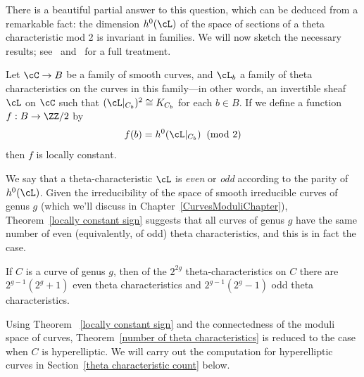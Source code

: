  There is a beautiful partial answer to this question, which can be deduced from a remarkable fact: the dimension $h^0(\cL)$ of the space of sections of a theta characteristic mod 2 is invariant in families.
We will now
sketch the necessary results; see~\cite{MumfordPaper} and~\cite{JHPaper} for a full treatment.

 \begin{theorem}\label{locally constant sign} Let $\cC \to B$ be a family of smooth curves, and $\cL_b$ a family of theta characteristics on the curves in this family---in other words, an invertible sheaf $\cL$ on $\cC$ such that $(\cL|_{C_b})^2 \cong K_{C_b}$ for each $b \in B$. If we define a function $f : B \to \ZZ/2$  by
 $$
 f(b) = h^0(\cL|_{C_b}) \;  \; (\text{mod } 2)
 $$
then $f$ is locally constant.
\end{theorem}

We say that a theta-characteristic $\cL$ is \emph{even} or \emph{odd} according to the parity of $h^0(\cL)$. Given the irreducibility of the space of smooth irreducible curves of genus $g$ (which we'll discuss in Chapter~\ref{CurvesModuliChapter}),  Theorem~\ref{locally constant sign} suggests that all curves of genus $g$ have the same number of even (equivalently, of odd) theta characteristics, and this is in fact the case. 

\begin{theorem}\label{number of theta characteristics}
If $C$ is a curve of genus $g$, then of the $2^{2g}$ theta-characteristics on $C$ there are $2^{g-1}(2^g + 1)$ even theta characteristics and $2^{g-1}(2^g-1)$ odd theta characteristics.
\end{theorem}

Using Theorem ~\ref{locally constant sign} and the connectedness of the moduli space of curves, 
Theorem~\ref{number of theta characteristics} is reduced to the case when $C$ is hyperelliptic. We will carry out the computation for hyperelliptic curves in Section~\ref{theta characteristic count} below.

